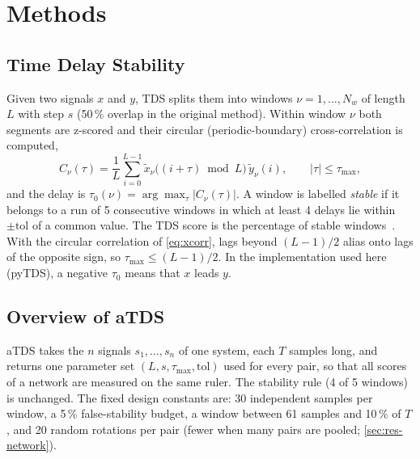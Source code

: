 \documentclass[11pt,a4paper]{article}
\begin{document}
\section{Methods}
\label{sec:method}
\subsection{Time Delay Stability}
\label{sec:tds}
Given two signals $x$ and $y$, TDS splits them into windows $\nu = 1, \dots, N_w$ of length $L$ with step $s$ (50\,\% overlap in the original method). Within window $\nu$ both segments are z-scored and their circular (periodic-boundary) cross-correlation is computed,
\begin{equation}
C_\nu(\tau) = \frac{1}{L} \sum_{i=0}^{L-1} \tilde{x}_\nu\big((i+\tau) \bmod L\big)\, \tilde{y}_\nu(i), \qquad |\tau| \le \tau_{\max} ,
\label{eq:xcorr}
\end{equation}
and the delay is $\tau_0(\nu) = \arg\max_\tau |C_\nu(\tau)|$. A window is labelled \emph{stable} if it belongs to a run of 5 consecutive windows in which at least 4 delays lie within $\pm\mathrm{tol}$ of a common value. The TDS score is the percentage of stable windows~\cite{Bashan2012NetworkPhysiology,Bartsch2015NetworkPhysiology}. With the circular correlation of \cref{eq:xcorr}, lags beyond $(L-1)/2$ alias onto lags of the opposite sign, so $\tau_{\max} \le (L-1)/2$. In the implementation used here (pyTDS), a negative $\tau_0$ means that $x$ leads $y$.

\subsection{Overview of aTDS}
aTDS takes the $n$ signals $s_1, \dots, s_n$ of one system, each $T$ samples long, and returns one parameter set $(L, s, \tau_{\max}, \mathrm{tol})$ used for every pair, so that all scores of a network are measured on the same ruler. The stability rule (4 of 5 windows) is unchanged. The fixed design constants are: 30 independent samples per window, a 5\,\% false-stability budget, a window between 61 samples and 10\,\% of $T$, and 20 random rotations per pair (fewer when many pairs are pooled; \cref{sec:res-network}).
\end{document}
